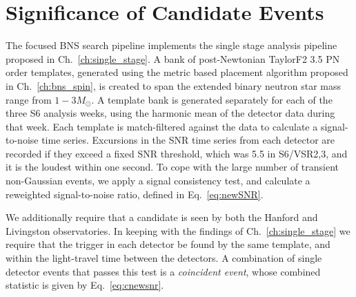 \section{Significance of Candidate Events}
\label{sec:pipeline}

The focused BNS search pipeline implements the single stage analysis pipeline proposed in Ch.~\ref{ch:single_stage}. A bank of post-Newtonian TaylorF2 3.5 PN order templates, generated using the metric based placement algorithm proposed in Ch.~\ref{ch:bns_spin}, is created to span the extended binary neutron star mass range from $1-3 M_\odot$. A template bank is generated separately for each of the three S6 analysis weeks, using the harmonic mean of the detector data during that week. Each template is match-filtered against the data to calculate a signal-to-noise time series. Excursions in the SNR time series from each detector are recorded if they exceed a fixed SNR threshold, which was 5.5 in S6/VSR2,3, and it is the loudest within one second. To cope with the large number of transient non-Gaussian events, we apply a signal consistency test, and calculate a reweighted signal-to-noise ratio, defined in Eq.~\eqref{eq:newSNR}.

We additionally require that a candidate is seen by both the Hanford and Livingston observatories. In keeping with the findings of Ch.~\ref{ch:single_stage} we require that the trigger in each detector be found by the same template, and within the light-travel time between the detectors. A combination of single detector events that passes this test is a \emph{coincident event}, whose combined statistic is given by Eq.~\eqref{eq:cnewsnr}.


